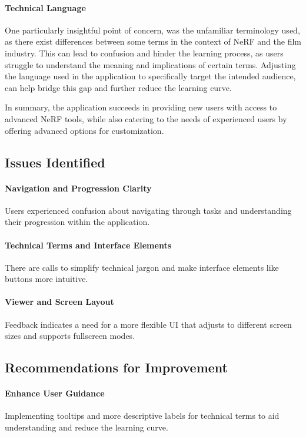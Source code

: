 \paragraph{Technical Language}
One particularly insightful point of concern, was the unfamiliar terminology used, as there exist differences between some terms in the context of NeRF and the film industry.
This can lead to confusion and hinder the learning process, as users struggle to understand the meaning and implications of certain terms.
Adjusting the language used in the application to specifically target the intended audience, can help bridge this gap and further reduce the learning curve.

In summary, the application succeeds in providing new users with access to advanced NeRF tools, while also catering to the needs of experienced users by offering advanced options for customization.

\subsection*{Issues Identified}
\label{sec:results:issues_identified}

\paragraph{Navigation and Progression Clarity}
Users experienced confusion about navigating through tasks and understanding their progression within the application.

\paragraph{Technical Terms and Interface Elements}
There are calls to simplify technical jargon and make interface elements like buttons more intuitive.

\paragraph{Viewer and Screen Layout}
Feedback indicates a need for a more flexible UI that adjusts to different screen sizes and supports fullscreen modes.

\subsection*{Recommendations for Improvement}
\label{sec:results:recommendations}

\paragraph{Enhance User Guidance}
Implementing tooltips and more descriptive labels for technical terms to aid understanding and reduce the learning curve.

